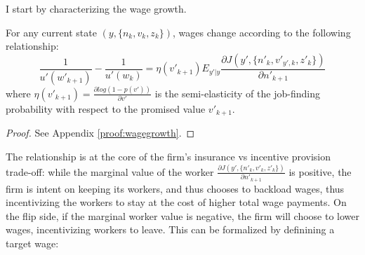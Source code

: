 I start by characterizing the wage growth.
\begin{proposition} \label{prop:wagegrowth}
  For any current state $(y,\{n_k,v_k,z_k\})$, wages change according to the following relationship:
\begin{equation} 
    \frac{1}{u'(w'_{k+1})} - \frac{1}{u'(w_k)} = \eta(v'_{k+1}) E_{y'|y} \frac{\partial J(y',\{n'_k,v'_{y',k},z'_k\})}{\partial n'_{k+1}}
\end{equation}
where $\eta(v'_{k+1}) = \frac{\partial log(1-p(v'))}{\partial v'}$ is the semi-elasticity of the job-finding probability with respect to the promised value $v'_{k+1}$.
\end{proposition}
\begin{proof}
  See Appendix \ref{proof:wagegrowth}.
\end{proof}
The relationship is at the core of the firm's insurance vs incentive provision trade-off: while the marginal value of the worker $\frac{\partial J(y',\{n'_k,v'_k,z'_k\})}{\partial n'_{k+1}}$ is positive, the firm is intent on keeping its workers, and thus chooses to backload wages, thus incentivizing the workers to stay at the cost of higher total wage payments. On the flip side, if the marginal worker value is negative, the firm will choose to lower wages, incentivizing workers to leave. This can be formalized by definining a target wage:
 

